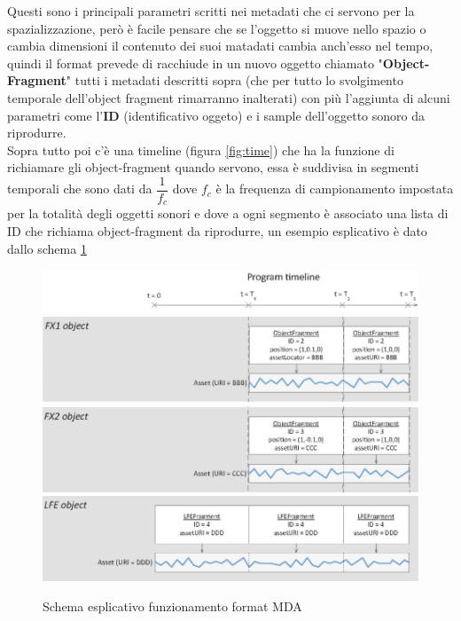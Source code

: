 \documentclass[12pt,a4paper]{report}
\begin{document}
Questi sono i principali parametri scritti nei metadati che ci servono per la spazializzazione, però è facile pensare che se l'oggetto si muove nello spazio o cambia dimensioni il contenuto dei suoi matadati cambia anch'esso nel tempo, quindi il format prevede di racchiude in un nuovo oggetto chiamato "\textbf{Object-Fragment}" tutti i metadati descritti sopra (che per tutto lo svolgimento temporale dell'object fragment rimarranno inalterati) con più l'aggiunta di alcuni parametri come l'\textbf{ID} (identificativo oggeto) e i sample dell'oggetto sonoro da riprodurre.\\

Sopra tutto poi c'è una timeline (figura \ref{fig:time}) che ha la funzione di richiamare gli object-fragment quando servono, essa è suddivisa in segmenti temporali che sono dati da $\dfrac{1}{f_c}$ dove $f_c$ è la frequenza di campionamento impostata per la totalità degli oggetti sonori e dove a ogni segmento è associato una lista di ID che richiama object-fragment da riprodurre, un esempio esplicativo è dato dallo schema \ref{fig:object}\\

\begin{figure}[htbp]
	\centering
	\includegraphics[scale=0.50]{figures/timeline.png}\\
	\includegraphics[scale=0.50]{figures/object1.png}\\
	\includegraphics[scale=0.50]{figures/object2.png}\\
	\includegraphics[scale=0.50]{figures/object3.png}
	\caption {Schema esplicativo funzionamento format MDA} 
	\label{fig:object}
	\end{figure}
\end{document}
